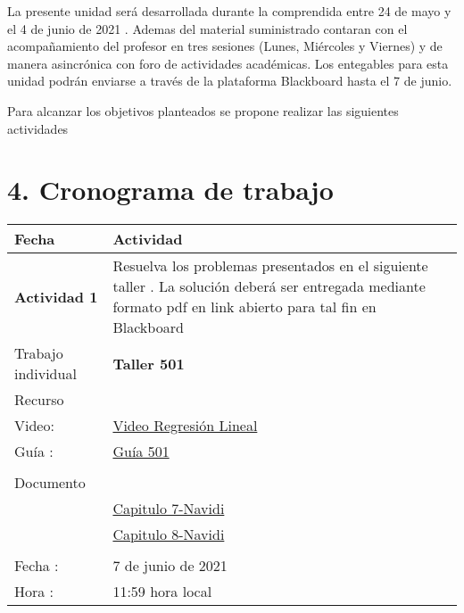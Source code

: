 \documentclass[base=hide,11pt]{elegantbook}
\begin{document}
La presente  unidad será desarrollada durante la comprendida entre 24 de mayo y el 4 de junio de 2021 .    
Ademas del material suministrado  contaran con el acompañamiento del profesor en tres sesiones (Lunes, Miércoles y Viernes) y de manera asincrónica con  foro de actividades académicas. Los entegables para esta unidad podrán enviarse a través de la plataforma Blackboard hasta el  7 de junio.

Para alcanzar los objetivos planteados se propone realizar las siguientes actividades
\section*{4. Cronograma de trabajo}

\begin{tabular}{p{4cm}p{10cm}}
\hline	
Fecha                   & Actividad	\\
\hline 	
{\bf Actividad 1}            & Resuelva los problemas presentados en el siguiente taller . La solución deberá ser entregada mediante formato pdf en link abierto para tal fin en Blackboard \\
Trabajo individual     & {\bf Taller 501} \\
Recurso & \\
%
%
Video:& \href{https://youtu.be/l2vx7ZPiaFI}{Video Regresión Lineal}\\
Guía :& \href{https://drive.google.com/file/d/1JH-plEtDZ4zT5fQVuG4lAo0a2FculN4i/view?usp=sharing}{ Guía 501}\\
&\\
Documento &\\
&\href{https://javerianacaliedu-my.sharepoint.com/:b:/g/personal/dgonzalez_javerianacali_edu_co/EVp0k50H9ZRIta2Bt_Lrfy4BnBrQCDVU9WtWtQDVVROpKQ?e=YVO9hQ}{Capitulo 7-Navidi}\\
& \href{https://javerianacaliedu-my.sharepoint.com/:b:/g/personal/dgonzalez_javerianacali_edu_co/EYoQNusqSudPokdd4rGBLNMBe7bYrnlmyme5XpNynO338A?e=G2K4Nn}{Capitulo 8-Navidi}\\
         
&\\
Fecha  : & 7 de junio de 2021\\
Hora   : & 11:59 hora local \\
\hline 

\end{tabular}
\vspace{1cm}
\end{document}
